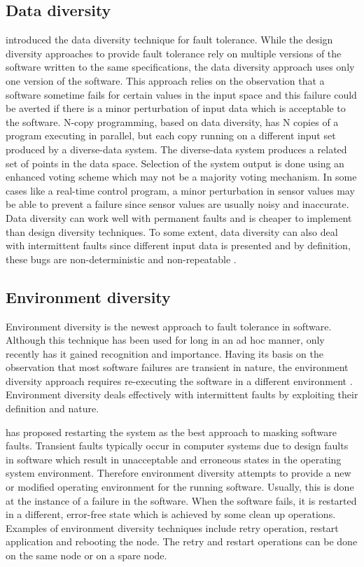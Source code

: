 \documentclass[oneside, a4paper, 11pt]{memoir}
\begin{document}
\subsection{Data diversity}
\citet{ammann1988data} introduced the data diversity technique for fault tolerance. While the design diversity approaches to provide fault tolerance rely on multiple versions of the software written to the same specifications, the data diversity approach uses only one version of the software. This approach relies on the observation that a software sometime fails for certain values in the input space and this failure could be averted if there is a minor perturbation of input data which is acceptable to the software. N-copy programming, based on data diversity, has N copies of a program executing in parallel, but each copy running on a different input set produced by a diverse-data system. The diverse-data system produces a related set of points in the data space. Selection of the system output is done using an enhanced voting scheme which may not be a majority voting mechanism. In some cases like a real-time control program, a minor perturbation in sensor values may be able to prevent a failure since sensor values are usually noisy and inaccurate. Data diversity can work well with permanent faults and is cheaper to implement than design diversity techniques. To some extent, data diversity can also deal with intermittent faults since different input data is presented and by definition, these bugs are non-deterministic and non-repeatable \citep{kapur2011software}.

\subsection{Environment diversity}
\label{sec:envdiv}
Environment diversity is the newest approach to fault tolerance in software. Although this technique has been used for long in an ad hoc manner, only recently has it gained recognition and importance. Having its basis on the observation that most software failures are transient in nature, the environment diversity approach requires re-executing the software in a different environment \citep{jalote1995framework}. Environment diversity deals effectively with intermittent faults by exploiting their definition and nature.

\citet{adams1984optimizing} has proposed restarting the system as the best approach to masking software faults. Transient faults typically occur in computer systems due to design faults in software which result in unacceptable and erroneous states in the operating system environment. Therefore environment diversity attempts to provide a new or modified operating environment for the running software. Usually, this is done at the instance of a failure in the software. When the software fails, it is restarted in a different, error-free state which is achieved by some clean up operations. Examples of environment diversity techniques include retry operation, restart application and rebooting the node. The retry and restart operations can be done on the same node or on a spare node.
\end{document}
